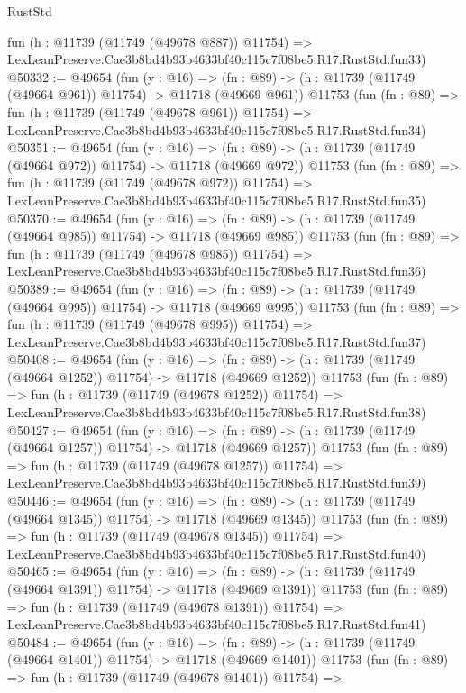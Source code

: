 \begin{lexlean}{RustStd}
\begin{coremodule}
    fun (h : @11739 (@11749 (@49678 @887)) @11754) =>
    LexLeanPreserve.Cae3b8bd4b93b4633bf40c115c7f08be5.R17.RustStd.fun33)
@50332 := @49654
    (fun (y : @16) =>
    (fn : @89) -> (h : @11739 (@11749 (@49664 @961)) @11754) -> @11718 (@49669 @961))
    @11753
    (fun (fn : @89) =>
    fun (h : @11739 (@11749 (@49678 @961)) @11754) =>
    LexLeanPreserve.Cae3b8bd4b93b4633bf40c115c7f08be5.R17.RustStd.fun34)
@50351 := @49654
    (fun (y : @16) =>
    (fn : @89) -> (h : @11739 (@11749 (@49664 @972)) @11754) -> @11718 (@49669 @972))
    @11753
    (fun (fn : @89) =>
    fun (h : @11739 (@11749 (@49678 @972)) @11754) =>
    LexLeanPreserve.Cae3b8bd4b93b4633bf40c115c7f08be5.R17.RustStd.fun35)
@50370 := @49654
    (fun (y : @16) =>
    (fn : @89) -> (h : @11739 (@11749 (@49664 @985)) @11754) -> @11718 (@49669 @985))
    @11753
    (fun (fn : @89) =>
    fun (h : @11739 (@11749 (@49678 @985)) @11754) =>
    LexLeanPreserve.Cae3b8bd4b93b4633bf40c115c7f08be5.R17.RustStd.fun36)
@50389 := @49654
    (fun (y : @16) =>
    (fn : @89) -> (h : @11739 (@11749 (@49664 @995)) @11754) -> @11718 (@49669 @995))
    @11753
    (fun (fn : @89) =>
    fun (h : @11739 (@11749 (@49678 @995)) @11754) =>
    LexLeanPreserve.Cae3b8bd4b93b4633bf40c115c7f08be5.R17.RustStd.fun37)
@50408 := @49654
    (fun (y : @16) =>
    (fn : @89) -> (h : @11739 (@11749 (@49664 @1252)) @11754) -> @11718 (@49669 @1252))
    @11753
    (fun (fn : @89) =>
    fun (h : @11739 (@11749 (@49678 @1252)) @11754) =>
    LexLeanPreserve.Cae3b8bd4b93b4633bf40c115c7f08be5.R17.RustStd.fun38)
@50427 := @49654
    (fun (y : @16) =>
    (fn : @89) -> (h : @11739 (@11749 (@49664 @1257)) @11754) -> @11718 (@49669 @1257))
    @11753
    (fun (fn : @89) =>
    fun (h : @11739 (@11749 (@49678 @1257)) @11754) =>
    LexLeanPreserve.Cae3b8bd4b93b4633bf40c115c7f08be5.R17.RustStd.fun39)
@50446 := @49654
    (fun (y : @16) =>
    (fn : @89) -> (h : @11739 (@11749 (@49664 @1345)) @11754) -> @11718 (@49669 @1345))
    @11753
    (fun (fn : @89) =>
    fun (h : @11739 (@11749 (@49678 @1345)) @11754) =>
    LexLeanPreserve.Cae3b8bd4b93b4633bf40c115c7f08be5.R17.RustStd.fun40)
@50465 := @49654
    (fun (y : @16) =>
    (fn : @89) -> (h : @11739 (@11749 (@49664 @1391)) @11754) -> @11718 (@49669 @1391))
    @11753
    (fun (fn : @89) =>
    fun (h : @11739 (@11749 (@49678 @1391)) @11754) =>
    LexLeanPreserve.Cae3b8bd4b93b4633bf40c115c7f08be5.R17.RustStd.fun41)
@50484 := @49654
    (fun (y : @16) =>
    (fn : @89) -> (h : @11739 (@11749 (@49664 @1401)) @11754) -> @11718 (@49669 @1401))
    @11753
    (fun (fn : @89) =>
    fun (h : @11739 (@11749 (@49678 @1401)) @11754) =>

\end{coremodule}
\end{lexlean}
